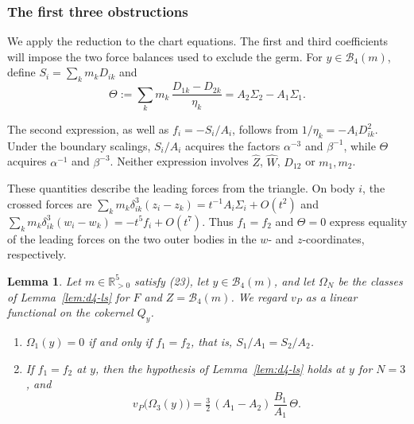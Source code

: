 \documentclass[Threeside,11pt]{article}
\newtheorem{lemma}[theorem]{Lemma}
\theoremstyle{definition}
\theoremstyle{remark}
\numberwithin{equation}{section}
\theoremstyle{remark}
\newcommand{\Rp}{\mathbb{R}_{>0}}
\newenvironment{alphalist}{\begin{enumerate}\renewcommand{\labelenumi}{(\alph{enumi})}%
  \renewcommand{\theenumi}{\alph{enumi}}}{\end{enumerate}}
\begin{document}
\subsubsection{The first three obstructions}\label{d4-obstructions}
{We apply the reduction to the chart equations. The first and third coefficients
will impose the two force balances used to exclude the germ.
For $y\in\mathcal B_4(m)$, define $S_i=\sum_km_kD_{ik}$ and}
\[
  \Theta:=\sum_km_k\,\frac{D_{1k}-D_{2k}}{\eta_k}=A_2\Sigma_2-A_1\Sigma_1 .
\]
{The second expression, as well as $f_i=-S_i/A_i$, follows from
$1/\eta_k=-A_iD_{ik}^2$. Under the boundary scalings, $S_i/A_i$ acquires the factors
$\alpha^{-3}$ and $\beta^{-1}$, while $\Theta$ acquires $\alpha^{-1}$ and $\beta^{-3}$.
Neither expression involves $\hat Z$, $\hat W$, $D_{12}$ or $m_1,m_2$.

These quantities describe the leading forces from the triangle.
On body $i$, the crossed forces are $\sum_km_k\delta_{ik}^3(z_i-z_k)=t^{-1}A_i\Sigma_i+O(t^2)$
and $\sum_km_k\delta_{ik}^3(w_i-w_k)=-t^5f_i+O(t^7)$.
Thus $f_1=f_2$ and $\Theta=0$ express equality of the leading forces on the two outer bodies
in the $w$- and $z$-coordinates, respectively.}

\begin{lemma}\label{lem:d4-obstr}
Let $m\in\Rp^5$ satisfy (23), let $y\in\mathcal B_4(m)$, and let $\Omega_N$ be the classes of
Lemma~\ref{lem:d4-ls} for $F$ and $Z=\mathcal B_4(m)$.
{We regard $v_P$ as a linear functional on the cokernel $Q_y$.}
\begin{alphalist}
  \item $\Omega_1(y)=0$ if and only if $f_1=f_2$, that is, $S_1/A_1=S_2/A_2$.
  \item If $f_1=f_2$ at $y$, then the hypothesis of Lemma~\ref{lem:d4-ls} holds at $y$ for
  $N=3$, and
  \[
    v_P\big(\Omega_3(y)\big)=\tfrac32\,(A_1-A_2)\,\frac{B_1}{A_1}\,\Theta .
  \]
\end{alphalist}
\end{lemma}
\end{document}

